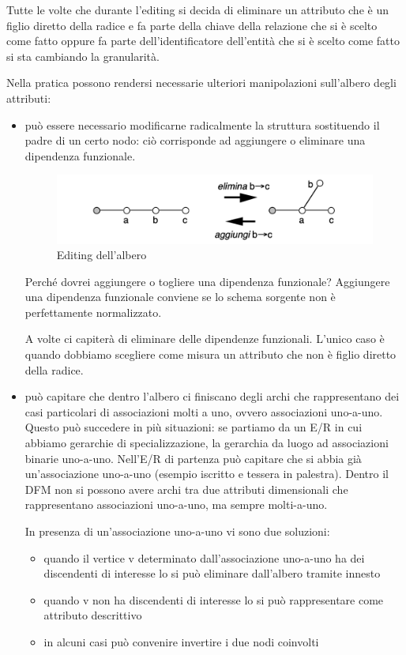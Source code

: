 	 Tutte le volte  che durante l’editing si decida di eliminare un attributo che è un figlio diretto della radice e fa parte della chiave della relazione che si è scelto come fatto oppure fa parte dell’identificatore dell’entità che si è scelto come fatto si sta cambiando la granularità. 
	 
	 Nella pratica possono rendersi necessarie ulteriori manipolazioni sull’albero degli attributi:
	 \begin{itemize}
	 	\item
	 	può essere necessario modificarne radicalmente la struttura sostituendo il padre di un certo nodo: ciò corrisponde ad aggiungere o eliminare una dipendenza funzionale. 
	 	\begin{figure}[H]
			\centering
			\includegraphics[width=0.6\linewidth]{img/editing}
			\caption{Editing dell'albero}
			\label{fig:editing}
	 	\end{figure}
 	Perché dovrei aggiungere o togliere una dipendenza funzionale? Aggiungere una dipendenza funzionale conviene se lo schema sorgente non è perfettamente normalizzato.
 	
 	A volte ci capiterà di eliminare delle dipendenze funzionali. L’unico caso è quando dobbiamo scegliere come misura un attributo che non è figlio diretto della radice. 
	 	\item 
	 	può capitare che dentro l’albero ci finiscano degli archi che rappresentano dei casi particolari di associazioni molti a uno, ovvero associazioni uno-a-uno. Questo può succedere in più situazioni: se partiamo da un E/R in cui abbiamo gerarchie di specializzazione, la gerarchia da luogo ad associazioni binarie uno-a-uno. Nell’E/R di partenza può capitare che si abbia già un’associazione uno-a-uno (esempio iscritto e tessera in palestra). Dentro il DFM non si possono avere archi tra due attributi dimensionali che rappresentano associazioni uno-a-uno, ma sempre molti-a-uno. 
	 	
	 	In presenza di un’associazione uno-a-uno vi sono due soluzioni:
	 	\begin{itemize}
	 		\item 
	 		quando il vertice v determinato dall’associazione uno-a-uno ha dei discendenti di interesse lo si può eliminare dall’albero tramite innesto
	 		\item 
	 		quando v non ha discendenti di interesse lo si può rappresentare come attributo descrittivo
	 		\item 
	 		in alcuni casi può convenire invertire i due nodi coinvolti
	 	\end{itemize}

	 \end{itemize}
 
